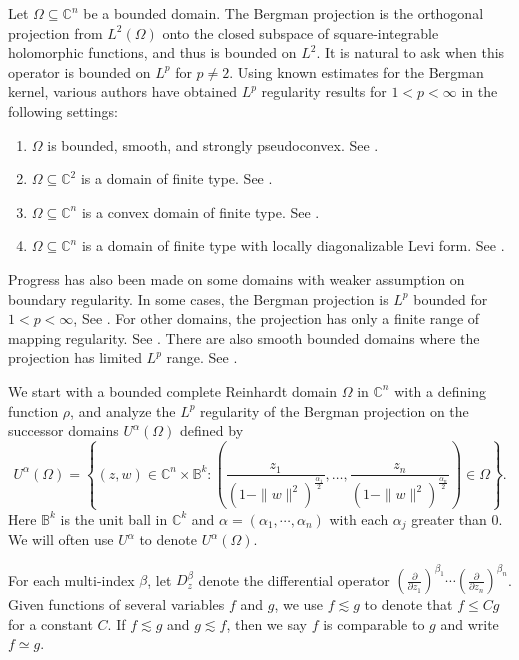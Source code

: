 \documentclass[reqno,12pt]{amsart}
\numberwithin{equation}{section}
\begin{document}
Let $\Omega\subseteq \mathbb C^n$ be a bounded domain. The Bergman projection is the orthogonal projection from $L^2(\Omega)$ onto the closed subspace of square-integrable holomorphic functions, and thus is bounded on $L^2$.
It is natural to ask when {this operator} is bounded on $L^p$ for $p\neq 2$. Using known estimates for the Bergman kernel, various authors have obtained $L^p$ regularity results for $1<p<\infty$ in the following settings:
\begin{enumerate}
	\item $\Omega$ is bounded, smooth, and strongly pseudoconvex. See \cite{Fefferman,PS}.
	\item $\Omega\subseteq\mathbb C^2$ is a domain of finite type. See \cite{McNeal1,McNeal3,NRSW}.
	\item $\Omega\subseteq\mathbb C^n$ is a convex domain of finite type. See \cite{McNeal3,McNeal2,MS}.
	\item $\Omega\subseteq\mathbb C^n$ is a domain of finite type with locally diagonalizable Levi form. See \cite{CD}.
\end{enumerate}
Progress has also been made on some domains with weaker assumption on boundary regularity. {In some cases,  the Bergman projection is $L^p$ bounded for $1<p<\infty$, See \cite{EL,LS}. For other domains, the projection has only a finite range of mapping regularity. See \cite{Yunus,DebrajY,EM,EM2,CHEN}. There are also smooth bounded domains where the projection has limited $L^p$ range. See \cite{BS}.} 

We start with a bounded {complete Reinhardt} domain $\Omega$ in $\mathbb C^n$ with a defining function $\rho$, and analyze the $L^p$ regularity of the Bergman projection on the successor domains {$U^{\alpha}(\Omega)$} defined by 
\begin{equation}\label{00}
U^{\alpha}(\Omega)=\left\{(z,w)\in \mathbb C^{n}\times \mathbb B^k:\left(\frac{z_1}{(1-\|w\|^2)^{\frac{\alpha_1}{2}}},\dots,\frac{z_n}{(1-\|w\|^2)^{\frac{\alpha_n}{2}}}\right)\in \Omega\right\}.
\end{equation}
{Here $\mathbb B^k$ is the unit ball in $\mathbb C^k$ and $\alpha=(\alpha_1,\cdots,\alpha_n)$ with each $\alpha_j$ greater than 0. We will often use $U^{\alpha}$ to denote $U^{\alpha}(\Omega)$.}

 For each multi-index $\beta$,  let $D^{\beta}_z$ denote the differential operator $(\frac{\partial}{\partial z_1})^{\beta_1}\cdots (\frac{\partial}{\partial z_n})^{\beta_n}$. {Given} {functions} of several variables $f$ and $g$, we use $f\lesssim g$ to denote that $f\leq Cg$ for a constant $C$. If $f\lesssim g$ and $g\lesssim f$, then we say $f$ is comparable to $g$ and write $f\simeq g$. 
 
\end{document}
